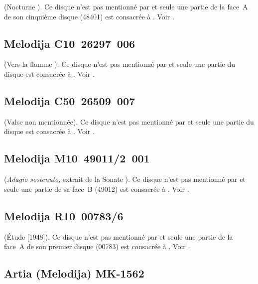\Chopin{} (Nocturne  ).
Ce disque n'est pas mentionné par \INikonovich{}
\citep[voir][]{Nikonovich11} et seule une partie de la face~A de son
cinquième disque (48401) est consacrée à \VSofronitsky{}.
Voir \citet{Recordssu}.

\subsection{Melodija C10~26297~006}

\Scriabine{} (Vers la flamme ).
Ce disque n'est pas mentionné par \INikonovich{}
\citep[voir][]{Nikonovich11} et seule une partie du disque est consacrée à
\VSofronitsky{}.
Voir \citet{Recordssu}.

\subsection{Melodija C50~26509~007}

\Chopin{} (Valse non mentionnée).
Ce disque n'est pas mentionné par \INikonovich{}
\citep[voir][]{Nikonovich11} et seule une partie du disque est consacrée à
\VSofronitsky{}.
Voir \citet{Recordssu}.

\subsection{Melodija M10~49011/2~001}

\Beethoven{} (\emph{Adagio sostenuto}, extrait de la Sonate 
).
Ce disque n'est pas mentionné par \INikonovich{}
\citep[voir][]{Nikonovich11} et seule une partie de sa face~B (49012) est
consacrée à \VSofronitsky{}.
Voir \citet{Recordssu}.

\subsection{Melodija R10~00783/6}

\Scriabine{} (Étude   [1948]).
Ce disque n'est pas mentionné par \INikonovich{}
\citep[voir][]{Nikonovich11} et seule une partie de la face~A de son premier
disque (00783) est consacrée à \VSofronitsky{}.
Voir \citet{Recordssu}.

\subsection{Artia (Melodija) MK-1562}

